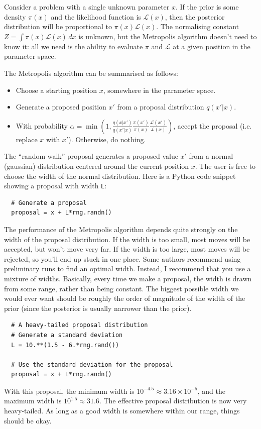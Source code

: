 Consider a problem with a single unknown
parameter $x$. If the prior is some density $\pi(x)$ and the likelihood
function is $\mathcal{L}(x)$, then the posterior distribution will be
proportional to $\pi(x)\mathcal{L}(x)$. The normalising constant
$Z = \int \pi(x) \mathcal{L}(x) \, dx$ is unknown,
but the Metropolis algorithm doesn't need to know it: all we need is the
ability to evaluate $\pi$ and $\mathcal{L}$ at a given position in the parameter space.

The Metropolis algorithm can be summarised as follows:
\begin{itemize}
\item Choose a starting position $x$, somewhere in the parameter space.
\item Generate a proposed position $x'$ from a proposal distribution
$q(x'|x)$.
\item With probability
$\alpha=\min\left(1, \frac{q(x|x')}{q(x'|x)}\frac{\pi(x')}{\pi(x)}\frac{\mathcal{L}(x')}{\mathcal{L}(x)}\right)$, accept the proposal
(i.e. replace $x$ with $x'$). Otherwise, do nothing.
\end{itemize}

The ``random walk'' proposal generates a proposed value $x'$ from a normal
(gaussian) distribution centered around the current position $x$. The user
is free to choose the width of the normal distribution. Here is a Python code
snippet showing a proposal with width {\tt L}:

\begin{verbatim}
  # Generate a proposal
  proposal = x + L*rng.randn()
\end{verbatim}

The performance of the Metropolis algorithm depends quite strongly on
the width of the proposal distribution. If the width is too small, most moves
will be accepted, but won't move very far. If the width is too large, most
moves will be rejected, so you'll end up stuck in one place. Some authors
recommend using preliminary runs to find an optimal width. Instead, I recommend
that you use a mixture of widths. Basically, every time we make a proposal,
the width is drawn from some range, rather than being constant. The biggest
possible width we would ever want should be roughly the order of magnitude of
the width of the prior (since the posterior is usually narrower than the
prior).
\begin{verbatim}
  # A heavy-tailed proposal distribution
  # Generate a standard deviation
  L = 10.**(1.5 - 6.*rng.rand())

  # Use the standard deviation for the proposal
  proposal = x + L*rng.randn()
\end{verbatim}
With this proposal, the minimum width is
$10^{-4.5} \approx 3.16 \times 10^{-5}$, and the maximum width is
$10^{1.5} \approx 31.6$. The effective proposal distribution is now very heavy-tailed. As long as a good width is somewhere within our range, things should be
okay.

